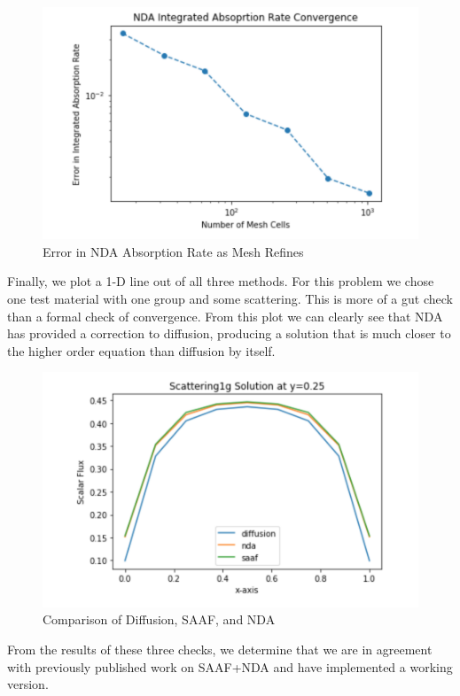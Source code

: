 \begin{figure}[H]
    \centering
    \includegraphics[width=.75\textwidth]{fig/NDAAbsorptionLogLog.png}
    \caption{Error in NDA Absorption Rate as Mesh Refines}
    \label{fig:abs_err}
\end{figure}

Finally, we plot a 1-D line out of all three methods. For this problem we chose one test material with one group and some scattering. This is more of a gut check than a formal check of convergence. From this plot we can clearly see that NDA has provided a correction to diffusion, producing a solution that is much closer to the higher order equation than diffusion by itself. 

\begin{figure}[H]
    \centering
    \includegraphics[width=.75\textwidth]{fig/LineOut25.png}
    \caption{Comparison of Diffusion, SAAF, and NDA}
    \label{fig:comparison}
\end{figure}

From the results of these three checks, we determine that we are in agreement with previously published work on SAAF+NDA and have implemented a working version. 
